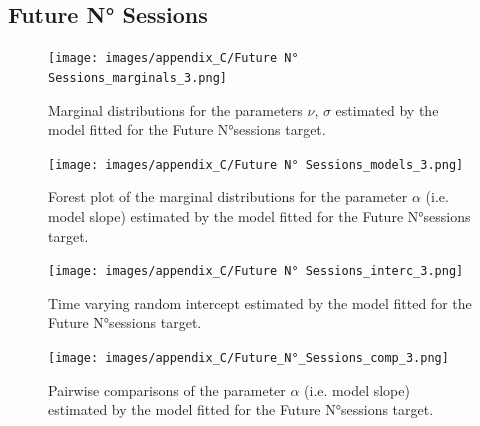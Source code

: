 \subsection{Future N° Sessions}
\label{future_no_sess_bayes_3}

\begin{figure}[ht]
\centering
\texttt{[image: images/appendix\_C/Future N° Sessions\_marginals\_3.png]}
\caption[\textbf{Future N°sessions marginal distributions}]{Marginal distributions for the parameters $\nu$, $\sigma$ estimated by the model fitted for the Future N°sessions target.}
\label{marginals_no_sess_3}
\end{figure} \FloatBarrier

\begin{figure}[ht]
\centering
\texttt{[image: images/appendix\_C/Future N° Sessions\_models\_3.png]}
\caption[\textbf{Future N°sessions model fixed effect}]{Forest plot of the marginal distributions for the parameter $\alpha$ (i.e. model slope) estimated by the model fitted for the Future N°sessions target.}
\label{model_no_sess_3}
\end{figure} \FloatBarrier

\begin{figure}[ht]
\centering
\texttt{[image: images/appendix\_C/Future N° Sessions\_interc\_3.png]}
\caption[\textbf{Future N°sessions time-varying random intercept}]{Time varying random intercept estimated by the model fitted for the Future N°sessions target.}
\label{interc_no_sess_3}
\end{figure} \FloatBarrier

\begin{figure}[ht]
\centering
\texttt{[image: images/appendix\_C/Future\_N°\_Sessions\_comp\_3.png]}
\caption[\textbf{Future N°sessions pairwise comparisons of model fixed effect}]{Pairwise comparisons of the parameter $\alpha$ (i.e. model slope) estimated by the model fitted for the Future N°sessions target.}
\label{comp_no_sess_3}
\end{figure} \FloatBarrier
